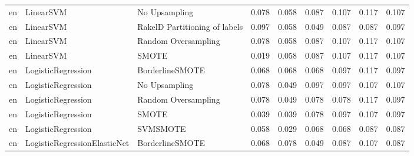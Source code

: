 \begin{tabular}{lllllllll}
      en &                       LinearSVM &                 No Upsampling &     0.078 &                     0.058 &                 0.087 &                  0.107 &                                   0.117 &     0.107 \\
      en &                       LinearSVM & RakelD Partitioning of labels &     0.097 &                     0.058 &                 0.049 &                  0.087 &                                   0.087 &     0.097 \\
      en &                       LinearSVM &           Random Oversampling &     0.078 &                     0.058 &                 0.087 &                  0.107 &                                   0.117 &     0.107 \\
      en &                       LinearSVM &                         SMOTE &     0.019 &                     0.058 &                 0.087 &                  0.107 &                                   0.117 &     0.107 \\
      en &              LogisticRegression &               BorderlineSMOTE &     0.068 &                     0.068 &                 0.068 &                  0.097 &                                   0.117 &     0.097 \\
      en &              LogisticRegression &                 No Upsampling &     0.078 &                     0.049 &                 0.097 &                  0.097 &                                   0.107 &     0.107 \\
      en &              LogisticRegression &           Random Oversampling &     0.078 &                     0.049 &                 0.078 &                  0.078 &                                   0.117 &     0.097 \\
      en &              LogisticRegression &                         SMOTE &     0.039 &                     0.039 &                 0.078 &                  0.097 &                                   0.107 &     0.097 \\
      en &              LogisticRegression &                      SVMSMOTE &     0.058 &                     0.029 &                 0.068 &                  0.068 &                                   0.087 &     0.087 \\
      en &    LogisticRegressionElasticNet &               BorderlineSMOTE &     0.068 &                     0.078 &                 0.049 &                  0.087 &                                   0.107 &     0.087 \\

\end{tabular}
